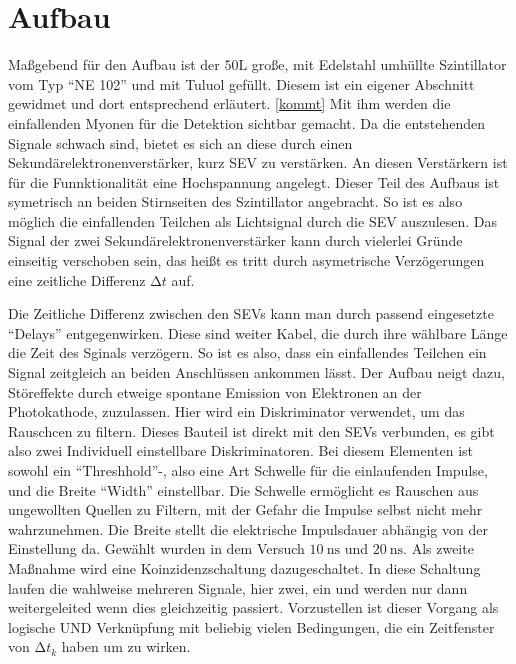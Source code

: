 \section{Aufbau}

\begin{minipage}{0.5\textwidth}
Maßgebend für den Aufbau ist der $50 \si{\liter}$ große, mit Edelstahl umhüllte Szintillator vom Typ \enquote{NE 102} und mit Tuluol gefüllt. Diesem ist ein eigener Abschnitt gewidmet und dort entsprechend erläutert. \ref{kommt}
Mit ihm werden die einfallenden Myonen für die Detektion sichtbar gemacht. Da die entstehenden Signale schwach sind, bietet es sich an diese durch einen Sekundärelektronenverstärker, kurz SEV zu verstärken. An diesen Verstärkern ist für
die Funnktionalität eine Hochspannung angelegt. Dieser Teil des Aufbaus ist symetrisch an beiden Stirnseiten des Szintillator angebracht. So ist es also möglich die einfallenden Teilchen als Lichtsignal durch die SEV auszulesen.
Das Signal der zwei Sekundärelektronenverstärker kann durch vielerlei Gründe einseitig verschoben sein, das heißt es tritt durch asymetrische Verzögerungen eine zeitliche Differenz $\increment t$ auf.
\end{minipage}
Die Zeitliche Differenz zwischen den SEVs kann man durch passend eingesetzte \enquote{Delays} entgegenwirken. Diese sind weiter Kabel, 
die durch ihre wählbare Länge die Zeit des Sginals verzögern. So ist es also, dass ein einfallendes Teilchen ein Signal zeitgleich an beiden Anschlüssen ankommen lässt.
Der Aufbau neigt dazu, Störeffekte durch etweige spontane Emission von Elektronen an der Photokathode, zuzulassen. Hier wird ein Diskriminator verwendet, um das Rauschcen zu filtern.
Dieses Bauteil ist direkt mit den SEVs verbunden, es gibt also zwei Individuell einstellbare Diskriminatoren. Bei diesem Elementen ist sowohl
ein \enquote{Threshhold}-, also eine Art Schwelle für die einlaufenden Impulse, und die Breite \enquote{Width} einstellbar.
Die Schwelle ermöglicht es Rauschen aus ungewollten Quellen zu Filtern, mit der Gefahr die Impulse selbst nicht mehr wahrzunehmen. 
Die Breite stellt die elektrische Impulsdauer abhängig von der Einstellung da. Gewählt wurden in dem Versuch $\SI{10}{\nano\second}$ und $\SI{20}{\nano\second}$.
Als zweite Maßnahme wird eine Koinzidenzschaltung dazugeschaltet. In diese Schaltung laufen die wahlweise mehreren Signale, hier zwei, ein und werden nur dann weitergeleited wenn dies gleichzeitig passiert.
Vorzustellen ist dieser Vorgang als logische UND Verknüpfung mit beliebig vielen Bedingungen, die ein Zeitfenster von $\increment t_k$ haben um zu wirken. 
